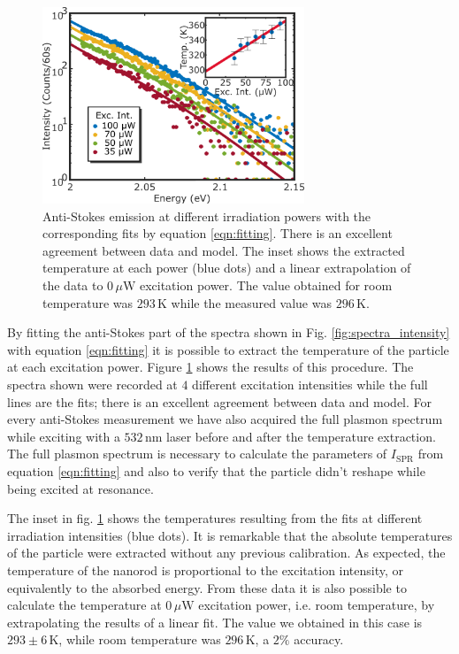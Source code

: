 \documentclass[journal=nalefd,manuscript=letter]{achemso}
\newcommand{\K}{\ensuremath{\,\textrm{K}}}
\newcommand{\nm}{\ensuremath{\,\textrm{nm}}}
\newcommand{\uW}{\ensuremath{\,\mu\textrm{W}}}
\begin{document}
\begin{figure}[tp] \centering
\includegraphics[width=78.4mm]{Figures/03_Fit_Of_AS/03_Log_Fit_AS.png}
\caption{Anti-Stokes emission at different irradiation powers with the
corresponding fits by equation \ref{eqn:fitting}. There is an excellent
agreement between data and model. The inset shows the extracted
temperature at each power (blue dots) and a linear extrapolation of the data to $0\uW$ excitation power.
The value obtained for room temperature was $293\K$ while the measured value was
$296\K$.}
	\label{fig:AS_in_Log}
\end{figure}

By fitting the anti-Stokes part of the spectra shown in Fig.
\ref{fig:spectra_intensity} with equation \ref{eqn:fitting} it is possible to extract
the temperature of the particle at each excitation power. Figure
\ref{fig:AS_in_Log} shows the results of this procedure. The spectra shown were
recorded at $4$ different excitation intensities while the full lines are the
fits; there is an excellent agreement between data and model. For every
anti-Stokes measurement we have also acquired the full plasmon spectrum while
exciting with a $532\nm$ laser before and after the temperature extraction.
The full plasmon spectrum is necessary to calculate the parameters of
$I_\textrm{SPR}$ from equation \ref{eqn:fitting} and also to verify that the
particle didn't reshape while being excited at resonance. 

The inset in fig. \ref{fig:AS_in_Log} shows the temperatures resulting from the
fits at different irradiation intensities (blue dots). It is remarkable that the
absolute temperatures of the particle were extracted without any previous
calibration. As expected, the temperature of the nanorod is proportional to the
excitation intensity, or equivalently to the absorbed energy. From these data it
is also possible to calculate the temperature at $0\uW$ excitation power, i.e.
room temperature, by extrapolating the results of a linear fit. The value we
obtained in this case is $293\pm 6 \K$, while room temperature was $296\K$, a
$2\%$ accuracy.
\end{document}
